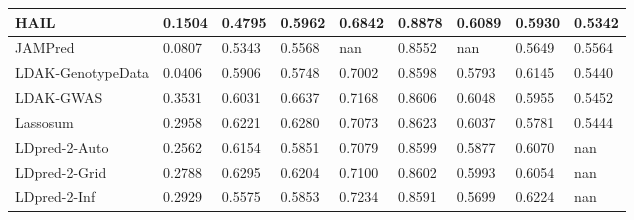 \documentclass[pdflatex,sn-basic]{sn-jnl}
\begin{document}
\begin{table}[!ht]
{\begin{tabular}{|l|l|l|l|l|l|l|l|l|}
\hline
HAIL \cite{Zhao_2024} & \cellcolor[HTML]{FDC97D}0.1504 & \cellcolor[HTML]{F8696B}0.4795 & \cellcolor[HTML]{E2E383}0.5962 & \cellcolor[HTML]{FCC17C}0.6842 & \cellcolor[HTML]{C3DA81}0.8878 & \cellcolor[HTML]{EEE683}0.6089 & \cellcolor[HTML]{FDD780}0.5930 & \cellcolor[HTML]{FBB178}0.5342 \\
\hline
JAMPred \cite{Newcombe_2019} & \cellcolor[HTML]{FA9F75}0.0807 & \cellcolor[HTML]{FBB078}0.5343 & \cellcolor[HTML]{FCC17C}0.5568 & nan & \cellcolor[HTML]{FEE983}0.8552 & nan & \cellcolor[HTML]{FBA376}0.5649 & \cellcolor[HTML]{E9E583}0.5564 \\
\hline
LDAK-GenotypeData & \cellcolor[HTML]{F98670}0.0406 & \cellcolor[HTML]{DDE182}0.5906 & \cellcolor[HTML]{FEE182}0.5748 & \cellcolor[HTML]{FEDE81}0.7002 & \cellcolor[HTML]{FEEA83}0.8598 & \cellcolor[HTML]{FCBB7A}0.5793 & \cellcolor[HTML]{E9E583}0.6145 & \cellcolor[HTML]{FFEB84}0.5440 \\
\hline
LDAK-GWAS \cite{Zhang_2021} & \cellcolor[HTML]{63BE7B}0.3531 & \cellcolor[HTML]{B6D680}0.6031 & \cellcolor[HTML]{63BE7B}0.6637 & \cellcolor[HTML]{DFE283}0.7168 & \cellcolor[HTML]{FEEB84}0.8606 & \cellcolor[HTML]{F7E984}0.6048 & \cellcolor[HTML]{FEDB81}0.5955 & \cellcolor[HTML]{FDEB84}0.5452 \\
\hline
Lassosum \cite{Mak_2017} & \cellcolor[HTML]{A1D07F}0.2958 & \cellcolor[HTML]{7BC57D}0.6221 & \cellcolor[HTML]{A6D27F}0.6280 & \cellcolor[HTML]{FFEB84}0.7073 & \cellcolor[HTML]{FBEA84}0.8623 & \cellcolor[HTML]{F9EA84}0.6037 & \cellcolor[HTML]{FCBB7A}0.5781 & \cellcolor[HTML]{FFEB84}0.5444 \\
\hline
LDpred-2-Auto \cite{Priv__2020} & \cellcolor[HTML]{CBDC81}0.2562 & \cellcolor[HTML]{8FCB7E}0.6154 & \cellcolor[HTML]{F7E984}0.5851 & \cellcolor[HTML]{FDEB84}0.7079 & \cellcolor[HTML]{FEEA83}0.8599 & \cellcolor[HTML]{FDCD7E}0.5877 & \cellcolor[HTML]{F9EA84}0.6070 & nan \\
\hline
LDpred-2-Grid \cite{Priv__2020} & \cellcolor[HTML]{B3D580}0.2788 & \cellcolor[HTML]{63BE7B}0.6295 & \cellcolor[HTML]{B4D680}0.6204 & \cellcolor[HTML]{F6E984}0.7100 & \cellcolor[HTML]{FFEB84}0.8602 & \cellcolor[HTML]{FEE783}0.5993 & \cellcolor[HTML]{FCEB84}0.6054 & nan \\
\hline
LDpred-2-Inf \cite{Priv__2020} & \cellcolor[HTML]{A4D17F}0.2929 & \cellcolor[HTML]{FDCE7E}0.5575 & \cellcolor[HTML]{F6E984}0.5853 & \cellcolor[HTML]{C8DC81}0.7234 & \cellcolor[HTML]{FEEA83}0.8591 & \cellcolor[HTML]{FBA676}0.5699 & \cellcolor[HTML]{D9E082}0.6224 & nan \\
\hline

\end{tabular}}
\end{table}
\end{document}
